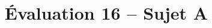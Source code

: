 \documentclass[a4paper]{article}
\begin{document}
\title{Évaluation 16 -- Sujet A}

\pagestyle{empty}

\date{}
\author{}

\maketitle{}

\thispagestyle{empty}

%
%
\end{document}
